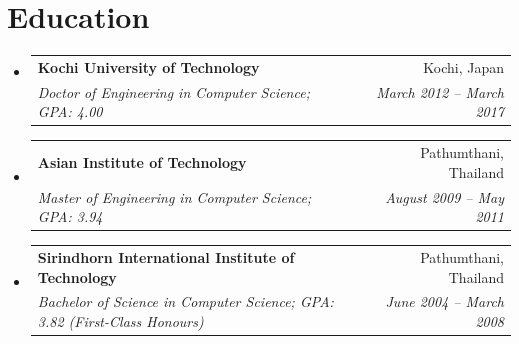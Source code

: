 \documentclass[letterpaper,11pt]{article}
\makeatletter
\newcommand{\resumeItem}[2]{
  \item\small{
    \textbf{#1}{: #2 \vspace{-2pt}}
  }
}
\newcommand{\resumeSubheading}[4]{
  \vspace{-1pt}\item
    \begin{tabular*}{0.97\textwidth}{l@{\extracolsep{\fill}}r}
      \textbf{#1} & #2 \\
      \textit{\small#3} & \textit{\small #4} \\
    \end{tabular*}\vspace{-5pt}
}
\newcommand{\resumeSubItem}[2]{\resumeItem{#1}{#2}\vspace{-4pt}}
\newcommand{\resumeSubHeadingListStart}{\begin{itemize}[leftmargin=*]}
\newcommand{\resumeSubHeadingListEnd}{\end{itemize}}
\makeatother
\begin{document}
\small



\small
\section{Education}
\resumeSubHeadingListStart
\resumeSubheading
{Kochi University of Technology}{Kochi, Japan}
{Doctor of Engineering in Computer Science;  GPA: 4.00}{March 2012 -- March 2017}
\resumeSubheading
{Asian Institute of Technology}{Pathumthani, Thailand}
{Master of Engineering in Computer Science;  GPA: 3.94 }{August 2009 -- May 2011}
\resumeSubheading
{Sirindhorn International Institute of Technology}{Pathumthani, Thailand}
{Bachelor of Science in Computer Science;  GPA: 3.82 (First-Class Honours)}{June 2004 -- March 2008}
\resumeSubHeadingListEnd
  
\end{document}
